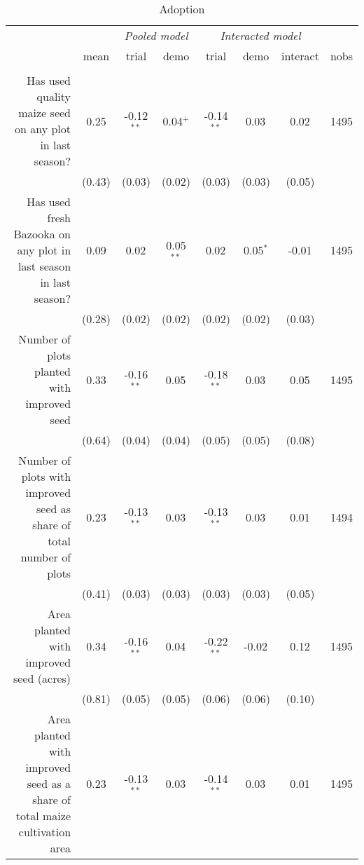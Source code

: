 \documentclass[english]{article}\usepackage[]{graphicx}\usepackage[]{xcolor}
\begin{document}
\begin{sidewaystable}
\caption{Adoption\label{adoptiom}}

\footnotesize
\begin{center}
\begin{tabular}{rccccccc}
\hline\hline
& & \multicolumn{2}{c}{\textit{Pooled model}} & \multicolumn{3}{c}{\textit{Interacted model}} \\
& mean & trial & demo & trial & demo & interact & nobs\\
\hline
\\
Has used quality maize seed on any plot in last season?
& 0.25
& -0.12$^{**}$
& 0.04$^{+}$ 
& -0.14$^{**}$ 
& 0.03$^{}$
& 0.02$^{}$ & 1495 \\

& (0.43) & (0.03)  & (0.02) & (0.03)  & (0.03)  & (0.05)
 \\

Has used fresh Bazooka on any plot in last season in last season?
& 0.09
& 0.02$^{}$
& 0.05$^{**}$ 
& 0.02$^{}$ 
& 0.05$^{*}$
& -0.01$^{}$ & 1495 \\

& (0.28) & (0.02)  & (0.02) & (0.02)  & (0.02)  & (0.03)
 \\

Number of plots planted with improved seed
& 0.33
& -0.16$^{**}$
& 0.05$^{}$ 
& -0.18$^{**}$ 
& 0.03$^{}$
& 0.05$^{}$ & 1495 \\

& (0.64) & (0.04)  & (0.04) & (0.05)  & (0.05)  & (0.08)
 \\

Number of plots with improved seed as share of total number of plots
& 0.23
& -0.13$^{**}$
& 0.03$^{}$ 
& -0.13$^{**}$ 
& 0.03$^{}$
& 0.01$^{}$ & 1494 \\

& (0.41) & (0.03)  & (0.03) & (0.03)  & (0.03)  & (0.05)
 \\


Area planted with improved seed (acres)
& 0.34
& -0.16$^{**}$
& 0.04$^{}$ 
& -0.22$^{**}$ 
& -0.02$^{}$
& 0.12$^{}$ & 1495 \\

& (0.81) & (0.05)  & (0.05) & (0.06)  & (0.06)  & (0.10)
 \\

Area planted with improved seed as a share of total maize cultivation area
& 0.23
& -0.13$^{**}$
& 0.03$^{}$ 
& -0.14$^{**}$ 
& 0.03$^{}$
& 0.01$^{}$ & 1495 \\


\end{tabular}
\end{center}
\end{sidewaystable}
\end{document}
